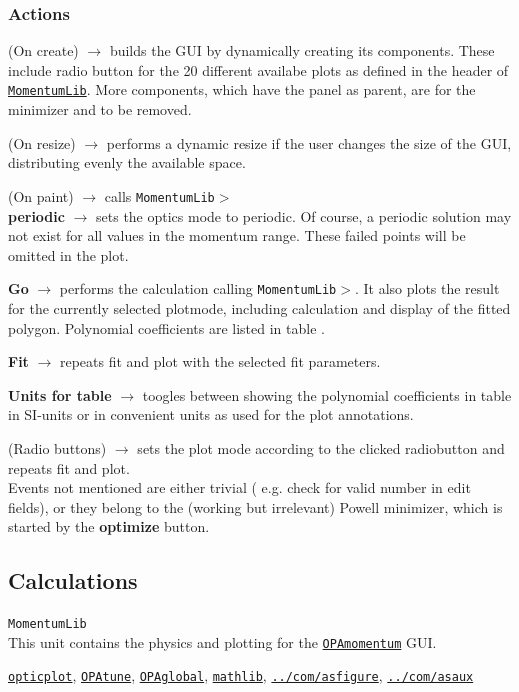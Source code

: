 \documentclass[12pt]{article}
\newcommand\code[1]{{\tt #1}}
\newcommand{\ofld}[1]{\colorbox{black!15}{{\bf #1}}}
\newcommand{\ofldx}[1]{\colorbox{black!15}{(#1)}}
\newcommand\guico[1]{{\color{blue}\code{#1}}}
\newcommand{\unico}[1]{{\color{burntorange}\code{#1}}}
\newcommand{\evcod}[2]{\ofld{#1} $\rightarrow$ \guico{#2}}
\newcommand{\evcodx}[2]{\ofldx{#1} $\rightarrow$ \guico{#2}}
\newcommand{\prcod}[2]{\opauni{#1}$>$\unico{#2}}
\newcommand{\opagui}[1]{\colorbox{blue!20}{\code{#1}}}
\newcommand{\ogui}[1]{\hyperref[#1]{\opagui{#1}}}
\newcommand{\opaguif}[1]{\colorbox{violet!30}{\code{#1}}}
\newcommand{\oguif}[1]{\hyperref[#1]{\opaguif{#1}}}
\newcommand{\opauni}[1]{\colorbox{orange!30}{\code{#1}}}
\newcommand{\ounih}[2]{\subsection{\label{#2}#1}{\Huge\opauni{#2}}\\}
\newcommand{\ouni}[1]{\hyperref[#1]{\opauni{#1}}}
\newcommand{\uses}[1]{\flushleft {\bf Uses:} #1}
\newcommand{\desc}[1]{#1}
\newcommand{\act}[1]{\subsubsection*{Actions} #1}
\newcommand{\todo}[1]{{\color{red} #1}}
\begin{document}
\act{
\evcodx{On create}{FormCreate} builds the GUI by dynamically creating its components. These include radio button for the 20 different availabe plots as defined in the header of \ouni{MomentumLib}. \todo{More components, which have the \guico{panmin} panel as parent, are for the minimizer and to be removed.}

\evcodx{On resize}{FormResize} performs a dynamic resize if the user changes the size of the GUI, distributing evenly the available space.

\evcodx{On paint}{FormPaint} calls \prcod{MomentumLib}{MakePlot}\\

\evcod{periodic}{chkPerClick} sets the optics mode to periodic. Of course, a periodic solution may not exist for all values in the momentum range. These failed points will be omitted in the plot.

\evcod{Go}{butGoClick} performs the calculation calling \prcod{MomentumLib}{FullCalc}. It also plots the result for the currently selected plotmode, including calculation and display of the fitted polygon. Polynomial coefficients are listed in table \guico{gfit}.

\evcod{Fit}{butFitClick} repeats fit and plot with the selected fit parameters.

\evcod{Units for table}{butfunitClick} toogles between showing the polynomial coefficients in table \guico{gfit} in SI-units or in convenient units as used for the plot annotations.

\evcodx{Radio buttons}{rbClick} sets the plot mode according to the clicked radiobutton and repeats fit and plot. \\

Events not mentioned are either trivial ( e.g. check for valid number in edit fields), or they belong to the (working but irrelevant) Powell minimizer, which is started by the \ofld{optimize} button. 
}


\ounih{Calculations}{MomentumLib} 

\desc{This unit contains the physics and plotting for the \ogui{OPAmomentum} GUI.
}

\uses{\ouni{opticplot}, \ogui{OPAtune}, \ouni{OPAglobal}, \ouni{mathlib}, \oguif{../com/asfigure}, \ouni{../com/asaux}} 
\end{document}
